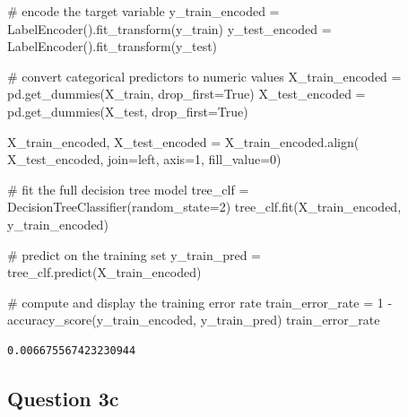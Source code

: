 \documentclass[
  letterpaper,
  DIV=11,
  numbers=noendperiod]{scrartcl}
\newenvironment{Shaded}{\begin{snugshade}}{\end{snugshade}}
\newcommand{\CommentTok}[1]{\textcolor[rgb]{0.37,0.37,0.37}{#1}}
\newcommand{\DecValTok}[1]{\textcolor[rgb]{0.68,0.00,0.00}{#1}}
\newcommand{\NormalTok}[1]{\textcolor[rgb]{0.00,0.23,0.31}{#1}}
\newcommand{\OperatorTok}[1]{\textcolor[rgb]{0.37,0.37,0.37}{#1}}
\newcommand{\StringTok}[1]{\textcolor[rgb]{0.13,0.47,0.30}{#1}}
\newcommand{\VariableTok}[1]{\textcolor[rgb]{0.07,0.07,0.07}{#1}}
\begin{document}
\begin{Shaded}
\begin{Highlighting}[]
\CommentTok{\# encode the target variable}
\NormalTok{y\_train\_encoded }\OperatorTok{=}\NormalTok{ LabelEncoder().fit\_transform(y\_train)}
\NormalTok{y\_test\_encoded }\OperatorTok{=}\NormalTok{ LabelEncoder().fit\_transform(y\_test)}

\CommentTok{\# convert categorical predictors to numeric values}
\NormalTok{X\_train\_encoded }\OperatorTok{=}\NormalTok{ pd.get\_dummies(X\_train, drop\_first}\OperatorTok{=}\VariableTok{True}\NormalTok{)}
\NormalTok{X\_test\_encoded }\OperatorTok{=}\NormalTok{ pd.get\_dummies(X\_test, drop\_first}\OperatorTok{=}\VariableTok{True}\NormalTok{)}

\NormalTok{X\_train\_encoded, X\_test\_encoded }\OperatorTok{=}\NormalTok{ X\_train\_encoded.align(}
\NormalTok{    X\_test\_encoded, join}\OperatorTok{=}\StringTok{\textquotesingle{}left\textquotesingle{}}\NormalTok{, axis}\OperatorTok{=}\DecValTok{1}\NormalTok{, fill\_value}\OperatorTok{=}\DecValTok{0}\NormalTok{)}

\CommentTok{\# fit the full decision tree model}
\NormalTok{tree\_clf }\OperatorTok{=}\NormalTok{ DecisionTreeClassifier(random\_state}\OperatorTok{=}\DecValTok{2}\NormalTok{)}
\NormalTok{tree\_clf.fit(X\_train\_encoded, y\_train\_encoded)}

\CommentTok{\# predict on the training set}
\NormalTok{y\_train\_pred }\OperatorTok{=}\NormalTok{ tree\_clf.predict(X\_train\_encoded)}

\CommentTok{\# compute and display the training error rate}
\NormalTok{train\_error\_rate }\OperatorTok{=} \DecValTok{1} \OperatorTok{{-}}\NormalTok{ accuracy\_score(y\_train\_encoded, y\_train\_pred)}
\NormalTok{train\_error\_rate}
\end{Highlighting}
\end{Shaded}

\begin{verbatim}
0.006675567423230944
\end{verbatim}

\subsection{Question 3c}\label{question-3c}
\end{document}
